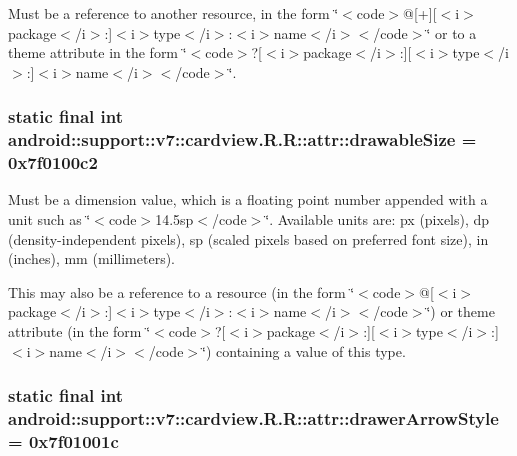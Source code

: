 Must be a reference to another resource, in the form \char`\"{}$<$code$>$@\mbox{[}+\mbox{]}\mbox{[}$<$i$>$package$<$/i$>$:\mbox{]}$<$i$>$type$<$/i$>$:$<$i$>$name$<$/i$>$$<$/code$>$\char`\"{} or to a theme attribute in the form \char`\"{}$<$code$>$?\mbox{[}$<$i$>$package$<$/i$>$:\mbox{]}\mbox{[}$<$i$>$type$<$/i$>$:\mbox{]}$<$i$>$name$<$/i$>$$<$/code$>$\char`\"{}. \hypertarget{classandroid_1_1support_1_1v7_1_1cardview_1_1_r_1_1attr_191a589505f360c593f17dd77f8ca8a5}{
\subsubsection[{drawableSize}]{\setlength{\rightskip}{0pt plus 5cm}static final int android::support::v7::cardview.R.R::attr::drawableSize = 0x7f0100c2}}
\label{classandroid_1_1support_1_1v7_1_1cardview_1_1_r_1_1attr_191a589505f360c593f17dd77f8ca8a5}


Must be a dimension value, which is a floating point number appended with a unit such as \char`\"{}$<$code$>$14.5sp$<$/code$>$\char`\"{}. Available units are: px (pixels), dp (density-independent pixels), sp (scaled pixels based on preferred font size), in (inches), mm (millimeters). 

This may also be a reference to a resource (in the form \char`\"{}$<$code$>$@\mbox{[}$<$i$>$package$<$/i$>$:\mbox{]}$<$i$>$type$<$/i$>$:$<$i$>$name$<$/i$>$$<$/code$>$\char`\"{}) or theme attribute (in the form \char`\"{}$<$code$>$?\mbox{[}$<$i$>$package$<$/i$>$:\mbox{]}\mbox{[}$<$i$>$type$<$/i$>$:\mbox{]}$<$i$>$name$<$/i$>$$<$/code$>$\char`\"{}) containing a value of this type. \hypertarget{classandroid_1_1support_1_1v7_1_1cardview_1_1_r_1_1attr_c903191489a8a58a76d61c4d3854d2b8}{
\subsubsection[{drawerArrowStyle}]{\setlength{\rightskip}{0pt plus 5cm}static final int android::support::v7::cardview.R.R::attr::drawerArrowStyle = 0x7f01001c}}
\label{classandroid_1_1support_1_1v7_1_1cardview_1_1_r_1_1attr_c903191489a8a58a76d61c4d3854d2b8}



